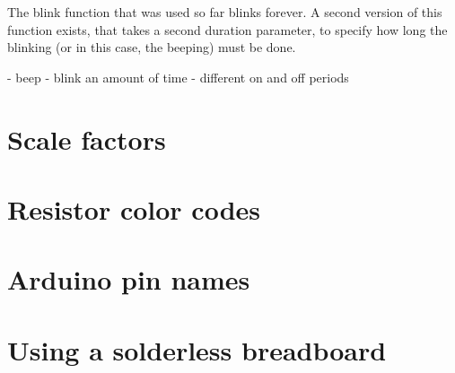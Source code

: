 \documentclass{article}
\begin{document}
The blink function that was used so far blinks forever.
A second version of this function exists, that takes a second
duration parameter, to specify how long the blinking
(or in this case, the beeping) must be done.


- beep
- blink an amount of time
- different on and off periods

\section{Scale factors}


\section{Resistor color codes}

\section{Arduino pin names}


\section{Using a solderless breadboard}
\end{document}
